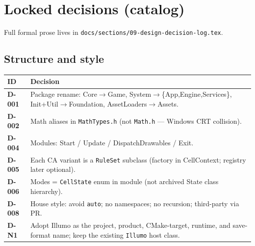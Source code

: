 \documentclass[10pt,a4paper]{article}
\begin{document}
\section{Locked decisions (catalog)}
Full formal prose lives in \texttt{docs/sections/09-design-decision-log.tex}.

\subsection{Structure and style}
\begin{table}[h!]
\centering
\small
\begin{tabularx}{\textwidth}{l X}
\toprule
\textbf{ID} & \textbf{Decision} \\
\midrule
\textbf{D-001} & Package rename: Core$\rightarrow$Game, System$\rightarrow$\{App,Engine,Services\}, Init+Util$\rightarrow$Foundation, AssetLoaders$\rightarrow$Assets. \\
\textbf{D-002} & Math aliases in \texttt{MathTypes.h} (not \texttt{Math.h} --- Windows CRT collision). \\
\textbf{D-004} & Modules: Start / Update / DispatchDrawables / Exit. \\
\textbf{D-005} & Each CA variant is a \texttt{RuleSet} subclass (factory in CellContext; registry later optional). \\
\textbf{D-006} & Modes = \texttt{CellState} enum in module (not archived State class hierarchy). \\
\textbf{D-008} & House style: avoid \texttt{auto}; no namespaces; no recursion; third-party via PR. \\
\textbf{D-N1} & Adopt Illumo as the project, product, CMake-target, runtime, and save-format name; keep the existing \texttt{Illumo} host class. \\
\bottomrule
\end{tabularx}
\end{table}
\end{document}

